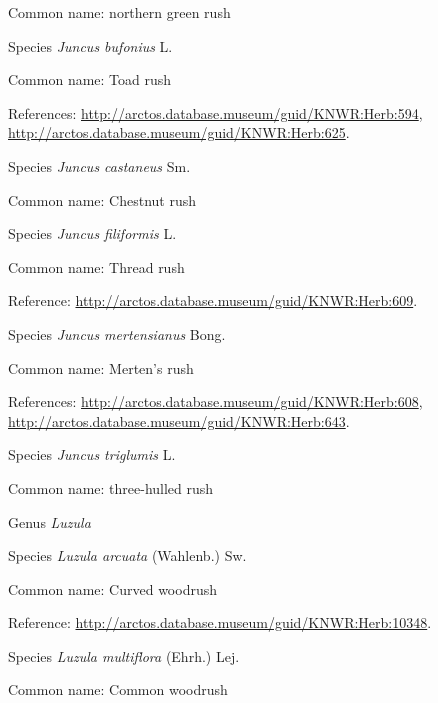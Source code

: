 \documentclass[9pt, article]{memoir}
\begin{document}
\begin{multicols}{2}
Common name: northern green rush

\vspace{6pt}\noindent\hspace{36pt}Species \textit{Juncus bufonius} L.


Common name: Toad rush

References: 
\url{http://arctos.database.museum/guid/KNWR:Herb:594}, 
\url{http://arctos.database.museum/guid/KNWR:Herb:625}.

\vspace{6pt}\noindent\hspace{36pt}Species \textit{Juncus castaneus} Sm.


Common name: Chestnut rush

\vspace{6pt}\noindent\hspace{36pt}Species \textit{Juncus filiformis} L.


Common name: Thread rush

Reference: 
\url{http://arctos.database.museum/guid/KNWR:Herb:609}.

\vspace{6pt}\noindent\hspace{36pt}Species \textit{Juncus mertensianus} Bong.


Common name: Merten's rush

References: 
\url{http://arctos.database.museum/guid/KNWR:Herb:608}, 
\url{http://arctos.database.museum/guid/KNWR:Herb:643}.

\vspace{6pt}\noindent\hspace{36pt}Species \textit{Juncus triglumis} L.


Common name: three-hulled rush

\vspace{6pt}\noindent\hspace{30pt}Genus \textit{Luzula}


\vspace{6pt}\noindent\hspace{36pt}Species \textit{Luzula arcuata} (Wahlenb.) Sw.


Common name: Curved woodrush

Reference: 
\url{http://arctos.database.museum/guid/KNWR:Herb:10348}.

\vspace{6pt}\noindent\hspace{36pt}Species \textit{Luzula multiflora} (Ehrh.) Lej.


Common name: Common woodrush


\end{multicols}
\end{document}
